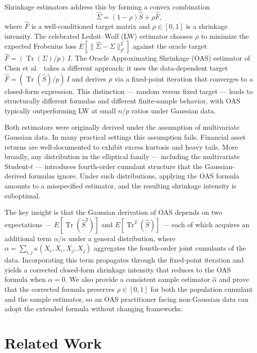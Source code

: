 \documentclass[journal]{IEEEtran}
\begin{document}
Shrinkage estimators address this by forming a convex combination
\begin{equation*}
\hat{\Sigma} = (1 - \rho)\hat{S} + \rho \hat{F},
\end{equation*}
where $\hat{F}$ is a well-conditioned target matrix and $\rho \in [0,1]$ is a shrinkage
intensity.
The celebrated Ledoit--Wolf (LW) estimator \cite{LW2004} chooses $\rho$ to minimize the
expected Frobenius loss $E[\lVert \hat{\Sigma} - \Sigma \rVert_F^2]$ against the oracle
target $\hat{F} = (\operatorname{Tr}(\Sigma)/p)\,I$.
The Oracle Approximating Shrinkage (OAS) estimator of Chen et al.\ \cite{OAS} takes a
different approach: it uses the data-dependent target
$\hat{F} = (\operatorname{Tr}(\hat{S})/p)\,I$ and derives $\rho$ via a fixed-point
iteration that converges to a closed-form expression.
This distinction --- random versus fixed target --- leads to structurally different
formulas and different finite-sample behavior, with OAS typically outperforming LW
at small $n/p$ ratios under Gaussian data.

Both estimators were originally derived under the assumption of multivariate Gaussian data.
In many practical settings this assumption fails.
Financial asset returns are well-documented to exhibit excess kurtosis and heavy tails.
More broadly, any distribution in the elliptical family --- including the multivariate
Student-$t$ --- introduces fourth-order cumulant structure that the Gaussian-derived
formulas ignore.
Under such distributions, applying the OAS formula amounts to a misspecified estimator,
and the resulting shrinkage intensity is suboptimal.

The key insight is that the Gaussian derivation of OAS depends on two expectations ---
$E[\operatorname{Tr}(\hat{S}^2)]$ and $E[\operatorname{Tr}^2(\hat{S})]$ --- each of which
acquires an additional term $\alpha/n$ under a general distribution, where
$\alpha = \sum_{i,j} \kappa(X_i, X_i, X_j, X_j)$ aggregates the fourth-order joint
cumulants of the data.
Incorporating this term propagates through the fixed-point iteration and yields a
corrected closed-form shrinkage intensity that reduces to the OAS formula when
$\alpha = 0$.
We also provide a consistent sample estimator $\hat{\alpha}$ and prove that the corrected
formula preserves $\rho \in [0,1]$ for both the population cumulant and the sample
estimator, so an OAS practitioner facing non-Gaussian data can adopt the extended
formula without changing frameworks.

\section{Related Work}\label{sec-related}
\end{document}
